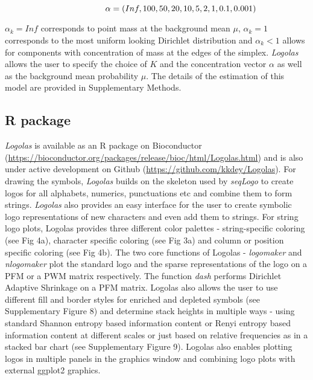 \documentclass{bmcart}
\begin{document}
\begin{equation}\label{alpha}
\hspace{2 cm} \alpha = ( Inf, 100, 50, 20, 10, 5, 2, 1, 0.1, 0.001) 
\end{equation}

$\alpha_{k} = Inf$ corresponds to point mass at the background mean $\mu$, $\alpha_{k}=1$ corresponds to the most uniform looking Dirichlet distribution and $\alpha_{k} < 1$ allows for components with concentration of mass at the edges of the simplex. \textit{Logolas} allows the user to specify the choice of $K$ and the concentration vector $\alpha$ as well as the background mean probability $\mu$. The details of the estimation of this model are provided in Supplementary Methods. 


\subsection*{R package}

\textit{Logolas} is available as an R package on Bioconductor (\url{https://bioconductor.org/packages/release/bioc/html/Logolas.html}) and is also under active development on Github (\url{https://github.com/kkdey/Logolas}). For drawing the symbols, \textit{Logolas} builds on the skeleton used by \textit{seqLogo} \cite{Bembom2017} to create logos for all alphabets, numerics, punctuations etc and combine them to form strings. \textit{Logolas} also provides an easy interface for the user to create symbolic logo representations of new characters and even add them to strings. For string logo plots, Logolas provides three different color palettes - string-specific coloring (see Fig 4a),  character specific coloring (see Fig 3a) and column or position specific coloring (see Fig 4b). The two core functions of Logolas - \textit{logomaker} and \textit{nlogomaker} plot the standard  logo and the sparse representations of the logo on a PFM or a PWM matrix respectively. The function \textit{dash} performs Dirichlet Adaptive Shrinkage on a PFM matrix. Logolas also allows the user to use different fill and border styles for enriched and depleted symbols (see Supplementary Figure 8) and determine stack heights in multiple ways - using standard Shannon entropy based information content or Renyi entropy based information content at different scales or just based on relative frequencies as in a stacked bar chart (see Supplementary Figure 9). Logolas also enables plotting logos in multiple panels in the graphics window and combining logo plots with external ggplot2 graphics. 
\end{document}
